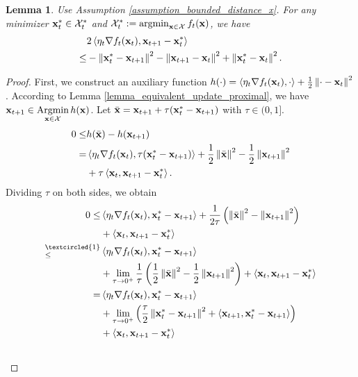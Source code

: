 \documentclass[journal]{IEEEtran}
\newtheorem{Lemma}{\bf{Lemma}}
\begin{document}
\begin{Lemma}
\label{lemma_I1_before} 
Use Assumption \ref{assumption_bounded_distance_x}.
For any minimizer ${\bf x}_t^{\ast} \in {\mathcal{X}}_t^{\ast}$ and $\Xcal_t^{\ast} :=  \argmin_{\x\in\Xcal} f_t(\x)$, we have 
\begin{align}
\label{equa_lemma_I1_before}
& 2\lrangle {\eta_t \nabla f_t(\x_t),  
\x_{t+1} - \x_t^{\ast}} \\ \nonumber 
\le &   -\lrnorm{\x_t^{\ast} - \x_{t+1}}^2 - \lrnorm{\x_{t+1} - \x_t}^2  + \lrnorm { \x_t^{\ast} - \x_t }^2.
\end{align}
\end{Lemma}
\begin{proof}
First, we construct an auxiliary function $h(\cdot )  = \left\langle\eta_t \nabla f_t({\bf x}_t), \cdot \right\rangle + \frac{1}{2}\left\lVert\cdot - {\bf x}_t\right\rVert^2$. According to Lemma \ref{lemma_equivalent_update_proximal}, we have $\x_{t+1} \in \Argmin\limits_{\x\in \Xcal} h(\x)$. Let $\bar{{\bf x}} = {\bf x}_{t+1} + \tau ({\bf x}_t^{\ast} - {\bf x}_{t+1})$ with $\tau\in (0,1]$. 
\begin{align}
\nonumber
0 \le & h(\bar{\x}) - h(\x_{t+1}) \\ \nonumber
= & \lrangle {\eta_t \nabla f_t(\x_t), \tau (\x_t^{\ast} - 
\x_{t+1})} + \frac{1}{2}\lrnorm{\bar{\x}}^2 - \frac{1}{2}\lrnorm {\x_{t+1}}^2 \\ \label{equa_tau} 
& + \tau \lrangle {\x_t, \x_{t+1} - \x_t^{\ast}}.
\end{align}  Dividing $\tau$ on both sides, we obtain
\begin{align}
\nonumber
0 \le &  \lrangle {\eta_t \nabla f_t(\x_t), \x_t^{\ast} - 
\x_{t+1}} + \frac{1}{2\tau}\left (\lrnorm{\bar{\x}}^2 - \lrnorm {\x_{t+1}}^2\right) \\ \nonumber 
& + \lrangle {\x_t, \x_{t+1} - \x_t^{\ast}}\\ \nonumber
\refabovecir{\le}{\textcircled{1}} & \lrangle {\eta_t \nabla f_t(\x_t), \x_t^{\ast} - 
\x_{t+1}} \\ \nonumber 
& + \lim_{\tau\rightarrow 0^{+}}\frac{1}{\tau}\left (\frac{1}{2}\lrnorm{\bar{\x}}^2 - \frac{1}{2}\lrnorm {\x_{t+1}}^2\right) + \lrangle {\x_t, \x_{t+1} - \x_t^{\ast}}\\ \nonumber
= & \lrangle {\eta_t \nabla f_t(\x_t), \x_t^{\ast} - 
\x_{t+1}} \\ \nonumber 
& + \lim_{\tau\rightarrow 0^{+}}\lrincir{ \frac{\tau}{2}\lrnorm{\x_t^{\ast} - \x_{t+1}}^2 + \lrangle{ \x_{t+1}, \x_t^\ast - \x_{t+1} } } \\ \nonumber
& + \lrangle {\x_t, \x_{t+1} - \x_t^{\ast}}\\ \nonumber

\end{align}
\end{proof}
\end{document}
